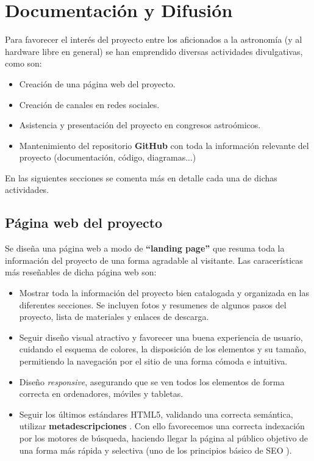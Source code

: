 \chapter{Documentación y Difusión}

Para favorecer el interés del proyecto entre los aficionados a la astronomía (y al hardware libre en general) se han emprendido diversas actividades divulgativas, como son:


\begin{itemize}
	\item Creación de una página web del proyecto.
	\item Creación de canales en redes sociales.
	\item Asistencia y presentación del proyecto en congresos astroómicos.
	\item Mantenimiento del repositorio \textbf{GitHub} con toda la información relevante del proyecto (documentación, código, diagramas...)
\end{itemize}

En las siguientes secciones se comenta más en detalle cada una de dichas actividades.


\section{Página web del proyecto}

Se diseña una página web a modo de \textbf{``landing page''} que resuma toda la información del proyecto de una forma agradable al visitante. Las caracerísticas más reseñables de dicha página web son:

\begin{itemize}
  \item Mostrar toda la información del proyecto bien catalogada y organizada en las diferentes secciones. 
 Se incluyen fotos y resumenes de algunos pasos del proyecto, lista de materiales y enlaces de descarga.

  \item Seguir diseño visual atractivo y favorecer una buena experiencia de usuario, cuidando el esquema de colores, la disposición de los elementos y su tamaño, permitiendo la navegación por el sitio de una forma cómoda e intuitiva.

  \item Diseño \textit{responsive}, asegurando que se ven todos los elementos de forma correcta en ordenadores, móviles y tabletas. 

  \item Seguir los últimos estándares HTML5, validando una correcta semántica, utilizar \textbf{metadescripciones} \cite{meta}. Con ello favorecemos  una correcta indexación por los motores de búsqueda, haciendo llegar la página al público objetivo de una forma más rápida y selectiva (uno de los principios básico de SEO \cite{seo}).
\end{itemize}

